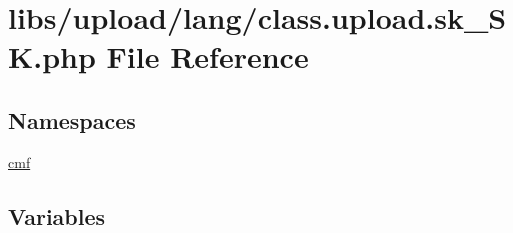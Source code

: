 \hypertarget{class_8upload_8sk___s_k_8php}{}\section{libs/upload/lang/class.upload.\+sk\+\_\+\+S\+K.\+php File Reference}
\label{class_8upload_8sk___s_k_8php}
\subsection*{Namespaces}
\begin{DoxyCompactItemize}
\item 
 \hyperlink{namespacecmf}{cmf}
\end{DoxyCompactItemize}
\subsection*{Variables}
